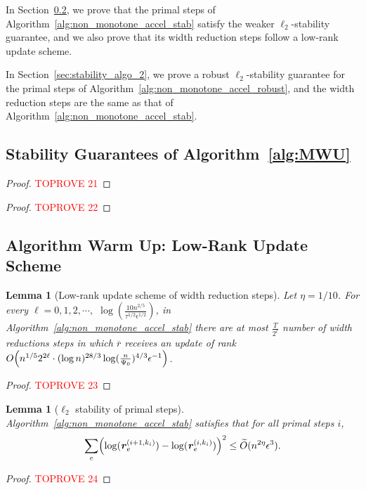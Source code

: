 \documentclass[11pt]{article}
\newtheorem{lemma}[theorem]{Lemma}
\let\originalleft\left
\let\originalright\right
\renewcommand{\left}{\mathopen{}\mathclose\bgroup\originalleft}
\renewcommand{\right}{\aftergroup\egroup\originalright}
\newcommand\rr{\boldsymbol{\mathit{r}}}
\newcommand\Otil{\widetilde{O}}
\newcommand{\ov}{\overline}
\begin{document}
In Section~\ref{sec:stability_algo_warm_up}, we prove that the primal steps of Algorithm~\ref{alg:non_monotone_accel_stab} satisfy the weaker $\ell_2$-stability guarantee, and we also prove that its width reduction steps follow a low-rank update scheme.

In Section~\ref{sec:stability_algo_2}, we prove a robust $\ell_2$-stability guarantee for the primal steps of Algorithm~\ref{alg:non_monotone_accel_robust}, and the width reduction steps are the same as that of Algorithm~\ref{alg:non_monotone_accel_stab}.


\subsection{Stability Guarantees of Algorithm~\ref{alg:MWU}}\label{sec:stability_algo_1}




\MonotonePrimal*

\begin{proof}\textcolor{red}{TOPROVE 21}\end{proof}

\MonotoneWidth*

\begin{proof}\textcolor{red}{TOPROVE 22}\end{proof}


\subsection{Algorithm Warm Up: Low-Rank Update Scheme}\label{sec:stability_algo_warm_up}
\begin{lemma}[Low-rank update scheme of width reduction steps]\label{lem:low_rank_update_width_reduction_steps}
Let $\eta = 1/10$. For every $\ell = 0,1, 2, \cdots,$ $ \log(\frac{10 n^{2/5}}{\tau^{1/2} \epsilon^{1/2}})$, in Algorithm~\ref{alg:non_monotone_accel_stab} there are at most $\frac{T}{2^{\ell}}$ number of width reductions steps in which $\ov{\rr}$ receives an update of rank $O\left(n^{1/5} 2^{2 \ell} \cdot (\log n)^{28/3} \log(\frac{n}{\Psi_0})^{4/3} \epsilon^{-1}\right)$. 
\end{lemma}
\begin{proof}\textcolor{red}{TOPROVE 23}\end{proof}


\begin{lemma}[$\ell_2$ stability of primal steps]
Algorithm~\ref{alg:non_monotone_accel_stab} satisfies that for all primal steps $i$,
\[
\sum_e \left(\log(\rr_e^{(i+1,k_i)})-\log (\rr_e^{(i,k_i)})\right)^2 \leq \Otil(n^{2\eta}\epsilon^{3}).
\]
\end{lemma}
\begin{proof}\textcolor{red}{TOPROVE 24}\end{proof}
\end{document}
